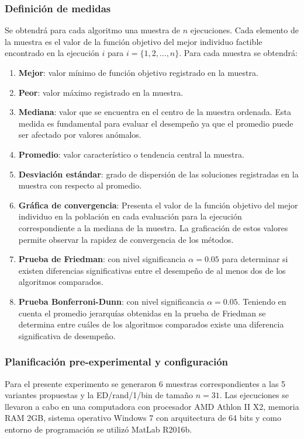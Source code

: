 \subsubsection{Definición de medidas}
Se obtendrá para cada algoritmo una muestra de $n$ ejecuciones. Cada elemento de la muestra es el valor de la función objetivo del mejor individuo factible encontrado en la ejecución $i$ para $i= \{ 1,2,...,n\}$. Para cada muestra se obtendrá:
\begin{enumerate}
	\item \textbf{Mejor}: valor mínimo de función objetivo registrado en la muestra.
	\item \textbf{Peor}: valor máximo registrado en la muestra.
	\item \textbf{Mediana}: valor que se encuentra en el centro de la muestra ordenada. Esta medida es fundamental para evaluar el desempeño ya que el promedio puede ser afectado por valores anómalos. 
	\item \textbf{Promedio}: valor característico o tendencia central la muestra.
	\item \textbf{Desviación estándar}: grado de dispersión de las soluciones registradas en la muestra con respecto al promedio.
	\item \textbf{Gráfica de convergencia}: Presenta el valor de la función objetivo del mejor individuo en la población en cada evaluación para la ejecución correspondiente a la mediana de la muestra. La graficación de estos valores permite observar la rapidez de convergencia de los métodos.
    \item \textbf{Prueba de Friedman}: con nivel significancia $\alpha=0.05$ para determinar si existen diferencias significativas entre el desempeño de al menos dos de los algoritmos comparados. 
	\item \textbf{Prueba Bonferroni-Dunn}: con nivel significancia $\alpha=0.05$. Teniendo en cuenta el promedio jerarquías obtenidas en la prueba de Friedman se determina entre cuáles de los algoritmos comparados existe una diferencia significativa de desempeño.     
\end{enumerate}
\subsubsection{Planificación pre-experimental y configuración}
Para el presente experimento se generaron 6 muestras correspondientes a las 5 variantes propuestas y la  ED/rand/1/bin de tamaño $n=31$. Las ejecuciones se llevaron a cabo en una computadora con procesador AMD Athlon II X2, memoria RAM 2GB, sistema operativo Windows 7 con arquitectura de 64 bits y como entorno de programación se utilizó  MatLab R2016b. 

